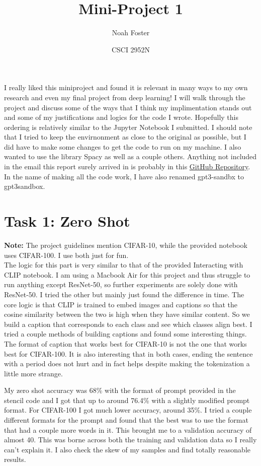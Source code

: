 \documentclass{article}
\title{Mini-Project 1}
\author{Noah Foster}
\date{CSCI 2952N}
\begin{document}
\maketitle

I really liked this miniproject and found it is relevant in many ways to my own research and even my final project from deep learning! I will walk through the project and discuss some of the ways that I think my implimentation stands out and some of my justifications and logics for the code I wrote. Hopefully this ordering is relatively similar to the Jupyter Notebook I submitted. I should note that I tried to keep the envirnonment as close to the original as possible, but I did have to make some changes to get the code to run on my machine. I also wanted to use the library Spacy as well as a couple others. Anything not included in the email this report surely arrived in is probably in this \href{https://github.com/usernamenoahfoster/2952FinalProject}{GitHub Repository}. In the name of making all the code work, I have also renamed gpt3-sandbx to gpt3sandbox. 
\section*{Task 1: Zero Shot}
\textbf{Note:} The project guidelines mention CIFAR-10, while the provided notebook uses CIFAR-100. I use both just for fun.\\

The logic for this part is very similar to that of the provided Interacting with CLIP notebook. I am using a Macbook Air for this project and thus struggle to run anything except ResNet-50, so further experiments are solely done with ResNet-50. I tried the other but mainly just found the difference in time. The core logic is that CLIP is trained to embed images and captions so that the cosine similarity between the two is high when they have similar content. So we build a caption that corresponds to each class and see which classes align best. I tried a couple methods of building captions and found some interesting things. The format of caption that works best for CIFAR-10 is not the one that works best for CIFAR-100. It is also interesting that in both cases, ending the sentence with a period does not hurt and in fact helps despite making the tokenization a little more strange. 

My zero shot accuracy was 68\% with the format of prompt provided in the stencil code and I got that up to around 76.4\% with a slightly modified prompt format. For CIFAR-100 I got much lower accuracy, around 35\%. I tried a couple different formats for the prompt and found that the best was to use the format that had a couple more words in it. This brought me to a validation accuracy of almost 40. This was borne across both the training and validation data so I really can't explain it. I also check the skew of my samples and find totally reasonable results.
\end{document}
